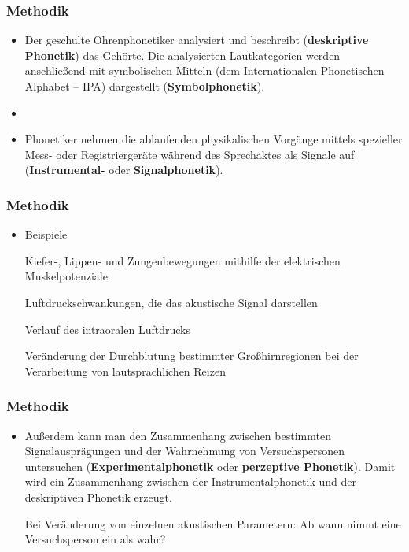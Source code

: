 
\begin{frame}
\frametitle{Methodik}

	\begin{itemize}
		\item Der geschulte Ohrenphonetiker analysiert und beschreibt (\textbf{deskriptive Phonetik}) das Gehörte. Die analysierten Lautkategorien werden anschließend mit symbolischen Mitteln (dem Internationalen Phonetischen Alphabet -- IPA) dargestellt (\textbf{Symbolphonetik}).
		\item[]
		\item Phonetiker nehmen die ablaufenden physikalischen Vorgänge mittels spezieller Mess- oder Registriergeräte während des Sprechaktes als Signale auf (\textbf{Instrumental-} oder \textbf{Signalphonetik}).
	\end{itemize}
	
\end{frame}




\begin{frame}
\frametitle{Methodik}

	\begin{itemize}
		\item Beispiele

			\ea Kiefer-, Lippen- und Zungenbewegungen mithilfe der elektrischen Muskelpotenziale
			\z
			
			\ea Luftdruckschwankungen, die das akustische Signal darstellen
			\z
			
			\ea Verlauf des intraoralen Luftdrucks
			\z
			
			\ea Veränderung der Durchblutung bestimmter Großhirnregionen bei der Verarbeitung von lautsprachlichen Reizen
			\z
			
	\end{itemize}
	
\end{frame}




\begin{frame}
\frametitle{Methodik}

	\begin{itemize}
		\item Außerdem kann man den Zusammenhang zwischen bestimmten Signalausprägungen und der Wahrnehmung von Versuchspersonen untersuchen (\textbf{Experimentalphonetik} oder \textbf{perzeptive Phonetik}). Damit wird ein Zusammenhang zwischen der Instrumentalphonetik und der deskriptiven Phonetik erzeugt.

		\ea Bei Veränderung von einzelnen akustischen Parametern: Ab wann nimmt eine Versuchsperson ein \textipa{[ da ]} als \textipa{[ ta ]} wahr?
		\z

	\end{itemize}
	
\end{frame}




